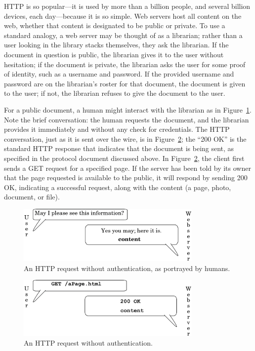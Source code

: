 \documentclass{article}
\begin{document}
	HTTP is so popular---it is used by more than a billion people, and several billion devices, each day---because it is so simple. Web servers host all content on the web, whether that content is designated to be public or private. To use a standard analogy, a web server may be thought of as a librarian; rather than a user looking in the library stacks themselves, they ask the librarian. If the document in question is public, the librarian gives it to the user without hesitation; if the document is private, the librarian asks the user for some proof of identity, such as a username and password. If the provided username and password are on the librarian's roster for that document, the document is given to the user; if not, the librarian refuses to give the document to the user.
	
	For a public document, a human might interact with the librarian as in Figure~\ref{fig:humnoauth}. Note the brief conversation: the human requests the document, and the librarian provides it immediately and without any check for credentials. The HTTP conversation, just as it is sent over the wire, is in Figure~\ref{fig:compnoauth}; the ``200 OK'' is the standard HTTP response that indicates that the document is being sent, as specified in the protocol document discussed above. In Figure~\ref{fig:compnoauth}, the client first sends a GET request for a specified page. If the server has been told by its owner that the page requested is available to the public, it will respond by sending 200 OK, indicating a successful request, along with the content (a page, photo, document, or file).
	
	
	\begin{figure}[ht!]
	  \centering
	  \includegraphics[width=0.8\textwidth]{diagrams/noauth2}
	  \caption{An HTTP request without authentication, as portrayed by humans.}
		\label{fig:humnoauth}
	\end{figure}
	
	\begin{figure}[ht!]
	  \centering
	  \includegraphics[width=0.8\textwidth]{diagrams/noauth2-2}
	  \caption{An HTTP request without authentication.}
		\label{fig:compnoauth}
	\end{figure}
		
\end{document}
